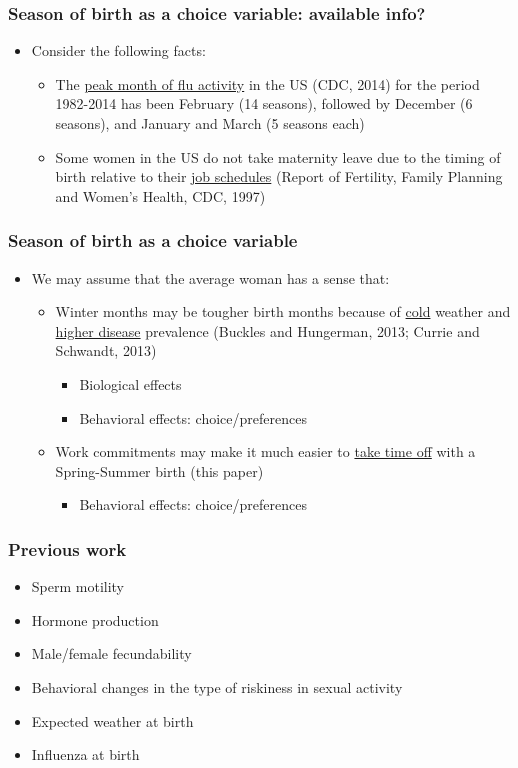 \documentclass[10pt,letterpaper,subeqn]{beamer}
\begin{document}
\begin{frame}
\frametitle{Season of birth as a choice variable: available info?}
\begin{itemize}
\item Consider the following facts:
\begin{itemize}
\item The \underline{peak month of flu activity} in the US (CDC, 2014) for the period 1982-2014 has been February (14 seasons), followed by December (6 seasons), and January and March (5 seasons each)
\item Some women in the US do not take maternity leave due to the timing of birth relative to their \underline{job schedules} (Report of Fertility, Family Planning and Women's Health, CDC, 1997)
\end{itemize}
\end{itemize}
\end{frame}


\begin{frame}
\frametitle{Season of birth as a choice variable}
\begin{itemize}
\item We may assume that the average woman has a sense that:
\begin{itemize}
\item Winter months may be tougher birth months because of \underline{cold} weather and \underline{higher disease} prevalence (Buckles and Hungerman, 2013; Currie and Schwandt, 2013)
\begin{itemize}
\item Biological effects
\item Behavioral effects: choice/preferences
\end{itemize}
\item Work commitments may make it much easier to \underline{take time off} with a Spring-Summer birth (\textcolor[rgb]{1.00,0.00,0.00}{this paper})
\begin{itemize}
\item Behavioral effects: choice/preferences
\end{itemize}
\end{itemize}
\end{itemize}
\end{frame}

\begin{frame}
\frametitle{Previous work}
\begin{itemize}
\item Sperm motility
\item Hormone production
\item Male/female fecundability 
\item Behavioral changes in the type of riskiness in sexual activity
\item Expected weather at birth
\item Influenza at birth
\end{itemize}
\end{frame}
\end{document}
